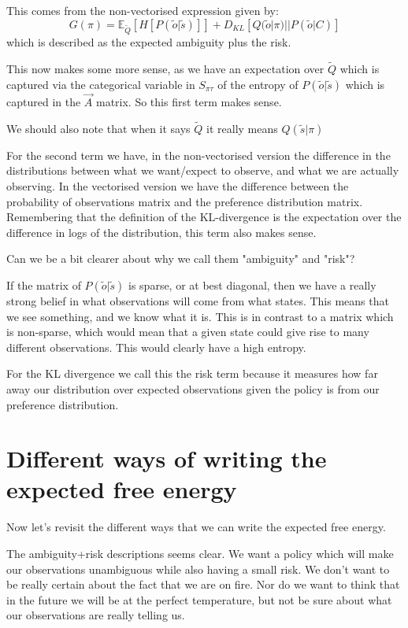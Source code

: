\documentclass[11pt,oneside]{memoir}
\begin{document}
This comes from the non-vectorised expression given by:
\begin{equation}
    G(\pi)=\mathbb{E}_{\tilde{Q}}\left[H\left[P(\tilde{o}|\tilde{s})\right]\right]+D_{KL}\left[Q(\tilde{o}|\pi)||P(\tilde{o}|C)\right]
\end{equation}
which is described as the expected ambiguity plus the risk.

This now makes some more sense, as we have an expectation over $\tilde{Q}$ which is captured via the categorical variable in $S_{\pi\tau}$ of the entropy of $P(\tilde{o}|\tilde{s})$ which is captured in the $\vec{A}$ matrix. So this first term makes sense. 

We should also note that when it says $\tilde{Q}$ it really means $Q(\tilde{s}|\pi)$

For the second term we have, in the non-vectorised version the difference in the distributions between what we want/expect to observe, and what we are actually observing. In the vectorised version we have the difference between the probability of observations matrix and the preference distribution matrix. Remembering that the definition of the KL-divergence is the expectation over the difference in logs of the distribution, this term also makes sense.

Can we be a bit clearer about why we call them "ambiguity" and "risk"?

If the matrix of $P(\tilde{o}|\tilde{s})$ is sparse, or at best diagonal, then we have a really strong belief in what observations will come from what states. This means that we see something, and we know what it is. This is in contrast to a matrix which is non-sparse, which would mean that a given state could give rise to many different observations. This would clearly have a high entropy. 

For the KL divergence we call this the risk term because it measures how far away our distribution over expected observations given the policy is from our preference distribution.

\section{Different ways of writing the expected free energy}

Now let's revisit the different ways that we can write the expected free energy.

The ambiguity+risk descriptions seems clear. We want a policy which will make our observations unambiguous while also having a small risk. We don't want to be really certain about the fact that we are on fire. Nor do we want to think that in the future we will be at the perfect temperature, but not be sure about what our observations are really telling us.
\end{document}
